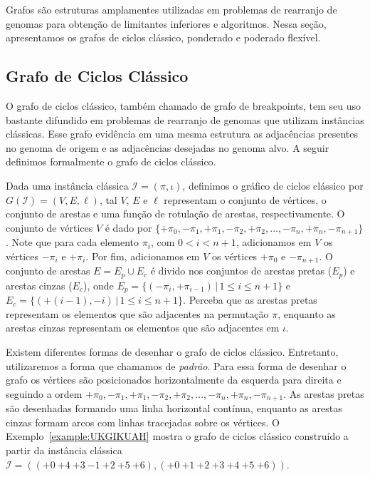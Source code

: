 Grafos são estruturas amplamentes utilizadas em problemas de rearranjo de genomas para obtenção de limitantes inferiores e algoritmos. Nessa seção, apresentamos os grafos de ciclos clássico, ponderado e poderado flexível.

\subsection{Grafo de Ciclos Clássico}

O grafo de ciclos clássico, também chamado de grafo de breakpoints, tem seu uso bastante difundido em problemas de rearranjo de genomas que utilizam instâncias clássicas. Esse grafo evidência em uma mesma estrutura as adjacências presentes no genoma de origem e as adjacências desejadas no genoma alvo. A seguir definimos formalmente o grafo de ciclos clássico.

Dada uma instância clássica $\mathcal{I} = (\pi,\iota)$, definimos o gráfico de ciclos clássico por $G(\mathcal{I}) = (V, E, \ell)$, tal $V$, $E$ e $\ell$ representam o conjunto de vértices, o conjunto de arestas e uma função de rotulação de arestas, respectivamente. O conjunto de vértices $V$ é dado por $\{{+\pi_0}, {-\pi_1}, {+\pi_1}, {-\pi_2}, {+\pi_2}, \dots, {-\pi_n}, {+\pi_n}, {-\pi_{n+1}}\}$. Note que para cada elemento $\pi_i$, com $0 < i < n+1$, adicionamos em $V$ os vértices ${-\pi_i}$ e ${+\pi_i}$. Por fim, adicionamos em $V$ os vértices ${+\pi_0}$ e ${-\pi_{n+1}}$. O conjunto de arestas $E = E_p \cup E_c$ é divido nos conjuntos de arestas pretas ($E_p$) e arestas cinzas ($E_c$), onde $E_p = \{(-\pi_i, +\pi_{i-1}) \,|\, 1 \leq i \leq n+1\}$ e $E_c = \{(+(i-1), -i) \,|\, 1 \leq i \leq n + 1\}$. Perceba que as arestas pretas representam os elementos que são adjacentes na permutação $\pi$, enquanto as arestas cinzas representam os elementos que são adjacentes em $\iota$.

Existem diferentes formas de desenhar o grafo de ciclos clássico. Entretanto, utilizaremos a forma que chamamos de \emph{padrão}. Para essa forma de desenhar o grafo os vértices são posicionados horizontalmente da esquerda para direita e seguindo a ordem ${+\pi_0}, {-\pi_1}, {+\pi_1}, {-\pi_2}, {+\pi_2}, \dots, {-\pi_n}, {+\pi_n}, {-\pi_{n+1}}$. As arestas pretas são desenhadas formando uma linha horizontal contínua, enquanto as arestas cinzas formam arcos com linhas tracejadas sobre os vértices. O Exemplo~\ref{example:UKGIKUAH} mostra o grafo de ciclos clássico construído a partir da instância clássica $\mathcal{I} = (({+0}~{+4}~{+3}~{-1}~{+2}~{+5}~{+6}),({+0}~{+1}~{+2}~{+3}~{+4}~{+5}~{+6}))$.

